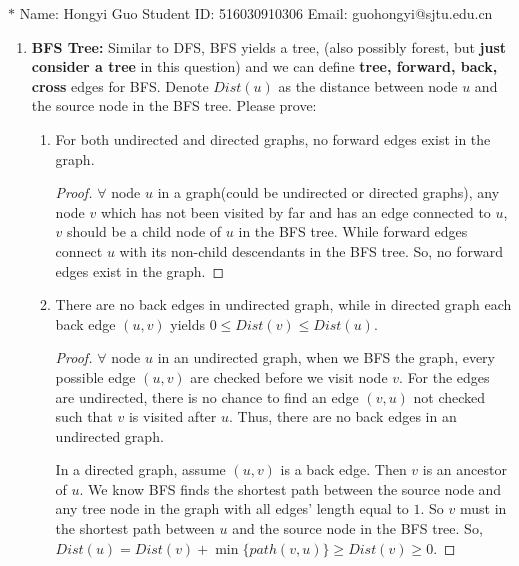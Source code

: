 \documentclass[12pt,a4paper]{article}
\theoremstyle{definition}
\begin{document}
\noindent

\noindent{}
\begin{center}

\footnotesize{\color{blue}$*$ Name: Hongyi Guo  \quad Student ID: 516030910306 \quad Email: guohongyi@sjtu.edu.cn}
\end{center}

\begin{enumerate}
\item \textbf{BFS Tree:} Similar to DFS, BFS yields a tree, (also possibly forest, but \textbf{just consider a tree} in this question) and we can define \textbf{tree, forward, back, cross} edges for BFS. Denote $Dist(u)$ as the distance between node $u$ and the source node in the BFS tree. Please prove:
    \begin{enumerate}
    \item For both undirected and directed graphs, no forward edges exist in the graph.
    \begin{proof}
    	$\forall$ node $u$ in a graph(could be undirected or directed graphs), any node $v$ which has not been visited by far and has an edge connected to $u$, $v$ should be a child node of $u$ in the BFS tree. While forward edges connect $u$ with its non-child descendants in the BFS tree. So, no forward edges exist in the graph.
    \end{proof}
    
    \item There are no back edges in undirected graph, while in directed graph each back edge $(u,v)$ yields $0\leq Dist(v)\leq Dist(u)$.
    \begin{proof}
    	$\forall$ node $u$ in an undirected graph, when we BFS the graph, every possible edge $(u,v)$ are checked before we visit node $v$. For the edges are undirected, there is no chance to find an edge $(v,u)$ not checked such that $v$ is visited after $u$. Thus, there are no back edges in an undirected graph.
    	
    	In a directed graph, assume $(u,v)$ is a back edge. Then $v$ is an ancestor of $u$. We know BFS finds the shortest path between the source node and any tree node in the graph with all edges' length equal to $1$. So $v$ must in the shortest path between $u$ and the source node in the BFS tree. So, $Dist(u)=Dist(v)+\min\{path(v,u)\}\geq Dist(v)\geq 0$.
    \end{proof}


\end{enumerate}
\end{enumerate}
\end{document}
